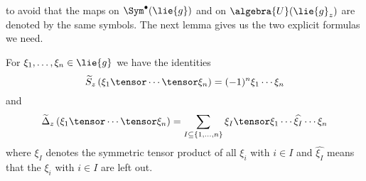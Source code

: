 to avoid that the maps on $\Sym^{\bullet}(\lie{g})$ and on $\algebra{U}
(\lie{g}_z)$ are denoted by the same symbols. The next lemma gives us the two 
explicit formulas we need.
\begin{lemma}
    \label{Thm:Hopf:Formulas}%
    For $\xi_1, \ldots, \xi_n \in \lie{g}$ we have the identities
    \begin{equation}
        \label{Hopf:AntipodeFormula}
        \widetilde{S}_z
        \left( \xi_1 \tensor \cdots \tensor \xi_n \right)
        =
        (-1)^n
        \xi_1 \cdots \xi_n
    \end{equation}
    and
    \begin{equation}
        \label{Hopf:CoproductFormula}
        \widetilde{\ocoproduct}_z
        \left(\xi_1 \tensor \cdots \tensor \xi_n \right)
        =
        \sum\limits_{
        	I \subseteq
        	\{1, \ldots, n\}
        }
        \xi_I
        \tensor
        \xi_1 \cdots
        \widehat{\xi_I}
        \cdots \xi_n
    \end{equation}
    where $\xi_I$ denotes the symmetric tensor product of all $\xi_i$ with 
    $i \in I$ and $\widehat{\xi_I}$ means that the $\xi_i$ with $i \in I$ 
    are left out.
\end{lemma}
